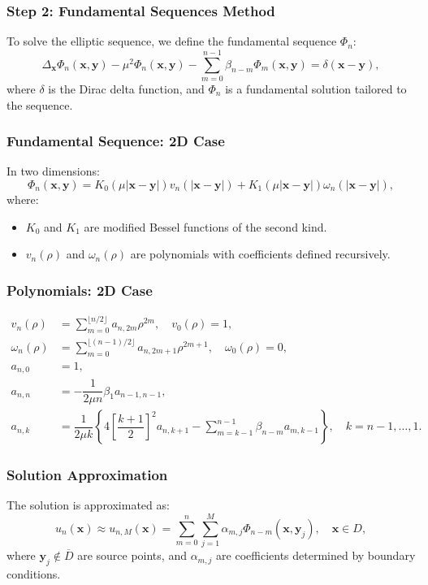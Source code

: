 \documentclass{beamer}
\newcommand{\bvec}[1]{\boldsymbol{#1}} %
\begin{document}
\begin{frame}
    \frametitle{Step 2: Fundamental Sequences Method}
    To solve the elliptic sequence, we define the fundamental sequence \( \Phi_n \):
    \begin{equation}
        \Delta_{\bvec{x}} \Phi_n(\bvec{x}, \bvec{y}) - \mu^2 \Phi_n(\bvec{x}, \bvec{y}) - \sum_{m=0}^{n-1} \beta_{n-m} \Phi_m(\bvec{x}, \bvec{y}) = \delta(\bvec{x} - \bvec{y}),
    \end{equation}
    where \( \delta \) is the Dirac delta function, and \( \Phi_n \) is a fundamental solution tailored to the sequence.
\end{frame}

\begin{frame}
    \frametitle{Fundamental Sequence: 2D Case}
    In two dimensions:
    \begin{equation}
        \Phi_n(\bvec{x}, \bvec{y}) = K_0(\mu |\bvec{x} - \bvec{y}|) v_n(|\bvec{x} - \bvec{y}|) + K_1(\mu |\bvec{x} - \bvec{y}|) \omega_n(|\bvec{x} - \bvec{y}|),
    \end{equation}
    where:
    \begin{itemize}
        \item \( K_0 \) and \( K_1 \) are modified Bessel functions of the second kind.
        \item \( v_n(\rho) \) and \( \omega_n(\rho) \) are polynomials with coefficients defined recursively.
    \end{itemize}
\end{frame}

\begin{frame}
    \frametitle{Polynomials: 2D Case}
    \begin{align}
        v_n(\rho) &= \sum_{m=0}^{\lfloor n/2 \rfloor} a_{n, 2m} \rho^{2m}, \quad v_0(\rho) = 1, \\
        \omega_n(\rho) &= \sum_{m=0}^{\lfloor (n-1)/2 \rfloor} a_{n, 2m+1} \rho^{2m+1}, \quad \omega_0(\rho) = 0, \\
        a_{n, 0} &= 1, \\
        a_{n, n} &= -\dfrac{1}{2 \mu n} \beta_1 a_{n-1, n-1}, \\
        a_{n, k} &= \dfrac{1}{2 \mu k} \left\{ 4 \left[ \dfrac{k+1}{2} \right]^2 a_{n, k+1} - \sum_{m=k-1}^{n-1} \beta_{n-m} a_{m, k-1} \right\}, \quad k = n-1, \ldots, 1.
    \end{align}
\end{frame}

\begin{frame}
    \frametitle{Solution Approximation}
    The solution is approximated as:
    \begin{equation}
        u_n(\bvec{x}) \approx u_{n, M}(\bvec{x}) = \sum_{m=0}^n \sum_{j=1}^M \alpha_{m, j} \Phi_{n-m}(\bvec{x}, \bvec{y}_j), \quad \bvec{x} \in D,
    \end{equation}
    where \( \bvec{y}_j \notin \overline{D} \) are source points, and \( \alpha_{m, j} \) are coefficients determined by boundary conditions.
\end{frame}
\end{document}
